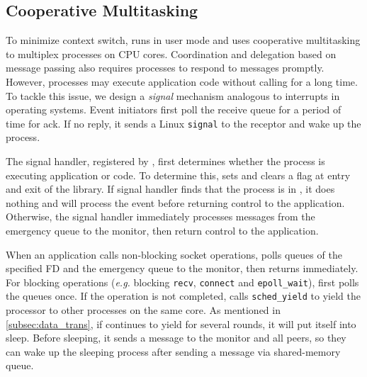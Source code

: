 

\subsection{Cooperative Multitasking}
\label{subsec:process-mux}

To minimize context switch, \sys{} runs in user mode and uses cooperative multitasking to multiplex processes on CPU cores. Coordination and delegation based on message passing also requires processes to respond to messages promptly. However, processes may execute application code without calling \libipc{} for a long time. To tackle this issue, we design a \textit{signal} mechanism analogous to interrupts in operating systems. Event initiators  first poll the receive queue for a period of time for ack. If no reply, it sends a Linux \texttt{signal} to the receptor and wake up the process.

The signal handler, registered by \libipc{}, first determines whether the process is executing application or \libipc{} code. To determine this, \libipc{} sets and clears a flag at entry and exit of the library. If signal handler finds that the process is in \libipc, it does nothing and \libipc{} will process the event before returning control to the application. Otherwise, the signal handler immediately processes messages from the emergency queue to the monitor, then return control to the application. 

When an application calls non-blocking socket operations, \libipc{} polls queues of the specified FD and the emergency queue to the monitor, then returns immediately. For blocking operations (\textit{e.g.} blocking \texttt{recv}, \texttt{connect} and \texttt{epoll\_wait}), \libipc{} first polls the queues once. If the operation is not completed, \libipc{} calls \texttt{sched\_yield} to yield the processor to other processes on the same core. %
As mentioned in \ref{subsec:data_trans}, if \libipc{} continues to yield for several rounds, it will put itself into sleep. Before sleeping, it sends a message to the monitor and all peers, so they can wake up the sleeping process after sending a message via shared-memory queue.

